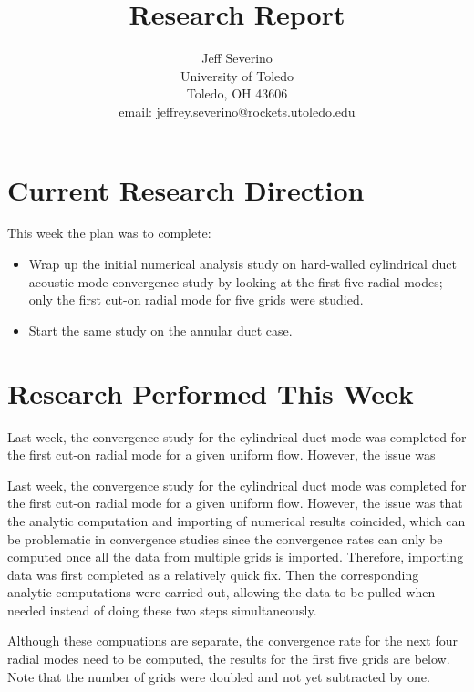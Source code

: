 \documentclass[a4paper]{report}
\begin{document}
\begin{titlepage}
\title{
Research Report}


\author{ Jeff Severino
 \\
University of Toledo \\
Toledo, OH  43606 \\
email:  jeffrey.severino@rockets.utoledo.edu}

\maketitle

\end{titlepage}

\section{Current Research Direction}
This week the plan was to complete:

\begin{itemize}
    \item Wrap up the initial numerical analysis study on hard-walled cylindrical 
        duct acoustic mode convergence study by looking at the first five 
        radial modes; only the first cut-on radial mode for five grids were studied. 
    \item Start the same study on the annular duct case.  
\end{itemize}

\section{Research Performed This Week}
Last week, the convergence study for the cylindrical duct mode was completed
for the first cut-on radial mode for a given uniform flow. However, the issue was

Last week, the convergence study for the cylindrical duct mode was completed for
the first cut-on radial mode for a given uniform flow. However, the issue was that
the analytic computation and importing of numerical results coincided, which can be
problematic in convergence studies since the convergence rates can only be computed
once all the data from multiple grids is imported. Therefore, importing data was first
completed as a relatively quick fix. Then the corresponding analytic computations were
carried out, allowing the data to be pulled when needed instead of doing these two
steps simultaneously. 

Although these compuations are separate, the convergence rate for the next 
four radial modes need to be computed, the results for the first five grids are 
below. Note that the number of grids were doubled and not yet subtracted by one.
\end{document}
